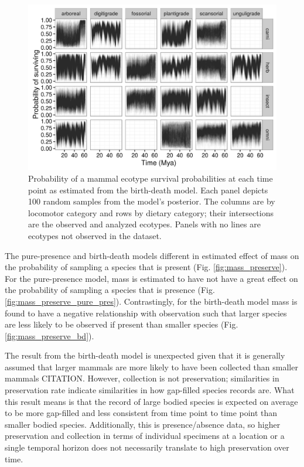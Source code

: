 \documentclass[12pt,letterpaper]{article}
\begin{document}
\begin{figure}[ht]
  \centering
  \includegraphics[width=\textwidth,height=0.5\textheight,keepaspectratio=true]{figure/ecotype_survival_bd}
  \caption[Ecotype survival probability estimated from the birth-death model]{Probability of a mammal ecotype survival probabilities at each time point as estimated from the birth-death model. Each panel depicts 100 random samples from the model's posterior. The columns are by locomotor category and rows by dietary category; their intersections are the observed and analyzed ecotypes. Panels with no lines are ecotypes not observed in the dataset.}
  \label{fig:eco_survival}
\end{figure}





The pure-presence and birth-death models different in estimated effect of mass on the probability of sampling a species that is present (Fig. \ref{fig:mass_preserve}). For the pure-presence model, mass is estimated to have not have a great effect on the probability of sampling a species that is presence (Fig. \ref{fig:mass_preserve_pure_pres}). Contrastingly, for the birth-death model mass is found to have a negative relationship with observation such that larger species are less likely to be observed if present than smaller species (Fig. \ref{fig:mass_preserve_bd}). 

The result from the birth-death model is unexpected given that it is generally assumed that larger mammals are more likely to have been collected than smaller mammals CITATION. However, collection is not preservation; similarities in preservation rate indicate similarities in how gap-filled species records are. What this result means is that the record of large bodied species is expected on average to be more gap-filled and less consistent from time point to time point than smaller bodied species. Additionally, this is presence/absence data, so higher preservation and collection in terms of individual specimens at a location or a single temporal horizon does not necessarily translate to high preservation over time.
\end{document}
